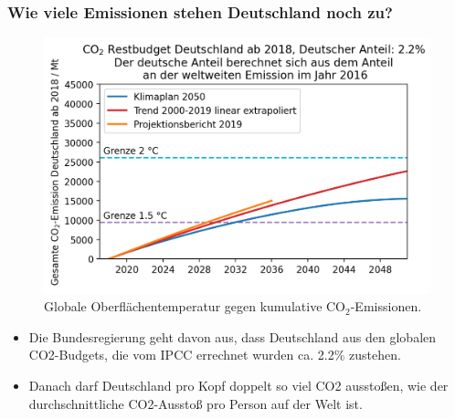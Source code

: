 \begin{frame}
    \frametitle{Wie viele Emissionen stehen Deutschland noch zu?}
	\begin{figure}
		\centering
		\includegraphics[height=.6\textheight]{bilder/restbudget_de_new.png}
		\caption{Globale Oberflächentemperatur gegen kumulative CO$_2$-Emissionen.}
    \end{figure}
    \begin{itemize}
        \item Die Bundesregierung geht davon aus, dass Deutschland aus den globalen CO2-Budgets, die vom IPCC errechnet wurden ca. 2.2\% zustehen.
        \item Danach darf Deutschland pro Kopf doppelt so viel CO2 ausstoßen, wie der durchschnittliche CO2-Ausstoß pro Person auf der Welt ist.
    \end{itemize}
    
\end{frame}
